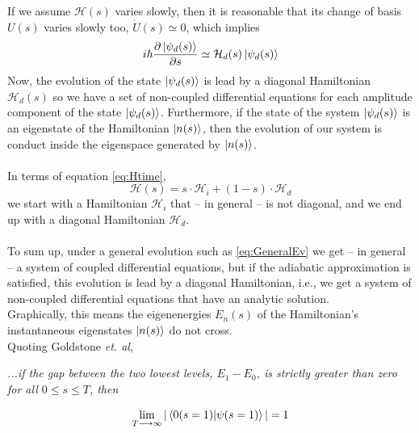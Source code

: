 If we assume $\mathcal{H}(s)$ varies slowly, then it is reasonable that its change of basis $U(s)$ varies slowly too, $\dot{U}(s) \simeq 0$, which implies
\begin{equation}
    i\hbar  \frac{\partial \ket{\psi_{d}(s)}}{\partial s} \simeq \mathcal{H}_{d}(s)\ket{\psi_{d}(s)}
\end{equation}
Now, the evolution of the state $\ket{\psi_{d}(s)}$ is lead by a diagonal Hamiltonian $\mathcal{H}_{d}(s)$ so we have a set of non-coupled differential equations for each amplitude component of the state $\ket{\psi_{d}(s)}$. Furthermore, if the state of the system $\ket{\psi_{d}(s)}$ is an eigenstate of the Hamiltonian $\ket{n(s)}$, then the evolution of our system is conduct inside the eigenspace generated by $\ket{n(s)}$.\\\\
In terms of equation \ref{eq:Htime},
\begin{equation}
    \mathcal{H}(s) = s\cdot\mathcal{H}_{i} + \left(1-s\right)\cdot\mathcal{H}_{d}
\end{equation}
we start with a Hamiltonian $\mathcal{H}_{i}$ that -- in general -- is not diagonal, and we end up with a diagonal Hamiltonian $\mathcal{H}_{d}$.\\\\
To sum up, under a general evolution such as \ref{eq:GeneralEv} we get -- in general -- a system of coupled differential equations, but if the adiabatic approximation is satisfied, this evolution is lead by a diagonal Hamiltonian, i.e., we get a system of non-coupled differential equations that have an analytic solution.\\
Graphically, this means the eigenenergies $E_{n}(s)$ of the Hamiltonian's instantaneous eigenstates $\ket{n(s)}$ do not cross.\\
Quoting Goldstone \textit{et. al},
\begin{displayquote}
\textit{...if the gap between the two lowest levels, $E_{1} - E_{0}$, is strictly greater than zero for all $0 \leq s \leq T$, then}
\end{displayquote}
\begin{equation}
    \lim_{T\longrightarrow \infty} | \braket{0(s=1) | \psi(s=1)}| = 1
\end{equation}
